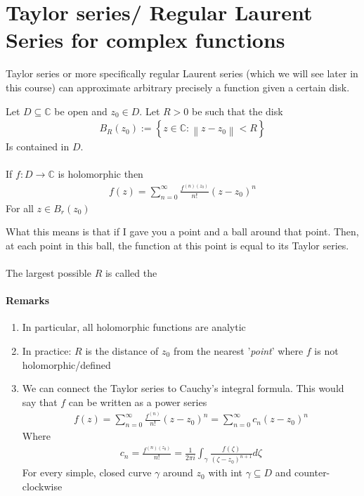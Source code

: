 \section{Taylor series/ Regular Laurent Series for complex functions}
Taylor series or more specifically regular Laurent series (which we will see later in this course) can approximate arbitrary precisely a function given a certain disk. 
\begin{theoreme}
Let $D \subseteq \mathbb{C}$ be open and $z_0 \in D$. Let $R > 0$ be such that the disk 
\begin{align*} B_R\left(z_0\right) := \left\{z \in \mathbb{C}: \left\|z - z_0\right\| < R\right\} \end{align*}
Is contained in $D$.\\
$ $\\
If $f : D \to \mathbb{C}$ is holomorphic then
\begin{align*} 
	f\left(z\right) =  \sum_{n= 0}^{\infty}\frac{f^{\left(n\right)\left(z_0\right)}}{n!}\left(z - z_0\right)^{n}
\end{align*}
For all $z \in B_r\left(z_0\right)$\\
\end{theoreme}
What this means is that if I gave you a point and a ball around that point. Then, at each point in this ball, the function at this point is equal to its Taylor series.\\
$ $\\
The largest possible $R$ is called the 

\paragraph{Remarks}%
\label{par:Remarks}


    \begin{enumerate}
        \item In particular, all holomorphic functions are analytic
        \item In practice: $R$ is the distance of $z_0$ from the nearest '\textit{point}' where $f$ is not holomorphic/defined
        \item We can connect the Taylor series to Cauchy's integral formula. This would say that $f$ can be written as a power series 
			\begin{align*} f\left(z\right) =  \sum_{n= 0}^{\infty}\frac{f^{\left(n\right)}}{n!}\left(z - z_0\right)^{n} = \sum_{n= 0}^{\infty}c_n\left(z - z_0\right)^{n} \end{align*}
			Where 
			\begin{align*} 
				c_n =  \frac{f^{\left(n\right)\left(z_0\right)}}{n!} =  \frac{1}{2\pi i}\int_{\gamma}\frac{f\left(\zeta\right)}{\left(\zeta - z_0\right)^{n+1}}d\zeta
			\end{align*}
			For every simple, closed curve $\gamma$ around $z_0$ with int $\gamma \subseteq D$ and counter-clockwise
    \end{enumerate}
    

